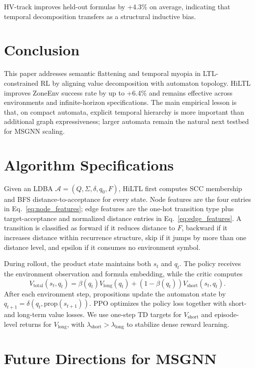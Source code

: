 \documentclass[conference]{IEEEtran}
\begin{document}
HV-track improves held-out formulas by +4.3\% on average, indicating that temporal decomposition transfers as a structural inductive bias.


\section{Conclusion}
\label{sec:conclusion}

This paper addresses semantic flattening and temporal myopia in LTL-constrained RL by aligning value decomposition with automaton topology. HiLTL improves ZoneEnv success rate by up to +6.4\% and remains effective across environments and infinite-horizon specifications. The main empirical lesson is that, on compact automata, explicit temporal hierarchy is more important than additional graph expressiveness; larger automata remain the natural next testbed for MSGNN scaling.

\appendices

\section{Algorithm Specifications}
\label{app:algorithms}

Given an LDBA $\mathcal{A}=(Q,\Sigma,\delta,q_0,F)$, HiLTL first computes SCC membership and BFS distance-to-acceptance for every state. Node features are the four entries in Eq.~\ref{eq:node_features}; edge features are the one-hot transition type plus target-acceptance and normalized distance entries in Eq.~\ref{eq:edge_features}. A transition is classified as forward if it reduces distance to $F$, backward if it increases distance within recurrence structure, skip if it jumps by more than one distance level, and epsilon if it consumes no environment symbol.

During rollout, the product state maintains both $s_t$ and $q_t$. The policy receives the environment observation and formula embedding, while the critic computes
\[
V_{\text{total}}(s_t,q_t)=\beta(q_t)V_{\text{long}}(q_t)+(1-\beta(q_t))V_{\text{short}}(s_t,q_t).
\]
After each environment step, propositions update the automaton state by $q_{t+1}=\delta(q_t,\text{prop}(s_{t+1}))$. PPO optimizes the policy loss together with short- and long-term value losses. We use one-step TD targets for $V_{\text{short}}$ and episode-level returns for $V_{\text{long}}$, with $\lambda_{\text{short}}>\lambda_{\text{long}}$ to stabilize dense reward learning.


\section{Future Directions for MSGNN}
\label{app:future_directions}
\end{document}
